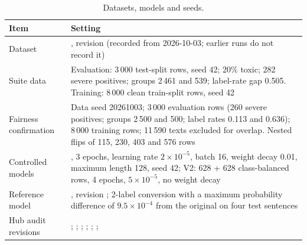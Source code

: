 \begin{table}[!htbp]
\centering\footnotesize
\caption{Datasets, models and seeds.}\label{tab:appdata}
\begin{tabularx}{\textwidth}{|>{\raggedright\arraybackslash}p{3.6cm}|L|}
\hline
\textbf{Item} & \textbf{Setting}\\
\hline
Dataset & , revision  (recorded from 2026-10-03; earlier runs do not record it)\\ \hline
Suite data & Evaluation: 3\,000 test-split rows, seed 42; 20\% toxic; 282 severe positives; groups 2\,461 and 539; label-rate gap 0.505. Training: 8\,000 clean train-split rows, seed 42\\ \hline
Fairness confirmation & Data seed 20261003; 3\,000 evaluation rows (260 severe positives; groups 2\,500 and 500; label rates 0.113 and 0.636); 8\,000 training rows; 11\,590 texts excluded for overlap. Nested flips of 115, 230, 403 and 576 rows\\ \hline
Controlled models & , 3 epochs, learning rate $2\times10^{-5}$, batch 16, weight decay 0.01, maximum length 128, seed 42; V2: 628 + 628 class-balanced rows, 4 epochs, $5\times10^{-5}$, no weight decay\\ \hline
Reference model & , revision ; 2-label conversion with a maximum probability difference of $9.5\times10^{-4}$ from the original on four test sentences\\ \hline
Hub audit revisions &  ;  ;  ;  ;  ;  ;  \\
\hline
\end{tabularx}
\end{table}

